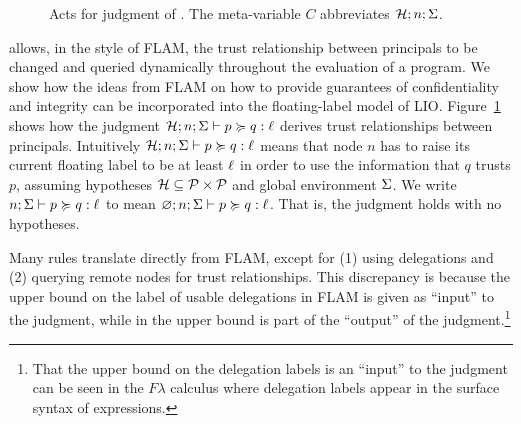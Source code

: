 \begin{figure}
    \caption{Acts for judgment of \lang. The meta-variable $C$ abbreviates $\mathcal{H}; n; \Sigma$.}
    \label{fig:act-for-judgment}
\end{figure}

\lang{} allows, in the style of FLAM, the trust relationship between principals to be changed and queried dynamically throughout the evaluation of a program. We show how the ideas from FLAM on how to provide guarantees of confidentiality and integrity can be incorporated into the floating-label model of LIO. Figure~\ref{fig:act-for-judgment} shows how the judgment $\mathcal{H}; n; \Sigma \vdash p \succcurlyeq q : \ell$ derives trust relationships between principals. Intuitively $\mathcal{H}; n; \Sigma \vdash p \succcurlyeq q : \ell$ means that node $n$ has to raise its current floating label to be at least $\ell$ in order to use the information that $q$ trusts $p$, assuming hypotheses $\mathcal{H} \subseteq \mathcal{P} \times \mathcal{P}$ and global environment $\Sigma$. We write $n; \Sigma \vdash p \succcurlyeq q : \ell$ to mean $\varnothing; n; \Sigma \vdash p \succcurlyeq q : \ell$. That is, the judgment holds with no hypotheses.

Many rules translate directly from FLAM, except for (1) using delegations and (2) querying remote nodes for trust relationships. This discrepancy is because the upper bound on the label of usable delegations in FLAM is given as ``input'' to the judgment, while in \lang{} the upper bound is part of the ``output'' of the judgment.\footnote{That the upper bound on the delegation labels is an ``input'' to the judgment can be seen in the $F\lambda$ calculus \cite{flamtr} where delegation labels appear in the surface syntax of expressions.}

